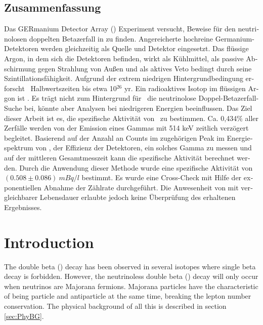 \documentclass[encoding=utf8,british]{tumphthesis}
\begin{document}
\begin{otherlanguage}{ngerman}
\chapter*{Zusammenfassung}
Das GERmanium Detector Array (\gerda) Experiment versucht, Beweise für den neutrinolosen doppelten Betazerfall in  zu finden.
Angereicherte hochreine Germanium-Detektoren werden gleichzeitig als Quelle und Detektor eingesetzt.
Das flüssige Argon, in dem sich die Detektoren befinden, wirkt als Kühlmittel, als passive Abschirmung gegen Strahlung von Außen und als aktives Veto bedingt durch seine Szintillationsfähigkeit.
Aufgrund der extrem niedrigen Hintergrundbedingung erforscht \gerda\ Halbwertszeiten bis etwa 10$^{26}$ yr.
Ein radioaktives Isotop im flüssigen Argon ist .
Es trägt nicht zum Hintergrund für \gerdas\ die neutrinolose Doppel-Betazerfall-Suche bei, könnte aber Analysen bei niedrigeren Energien beeinflussen.
Das Ziel dieser Arbeit ist es, die spezifische Aktivität von \Kr\ zu bestimmen.
Ca. 0,434$\%$ aller \Kr\-Zerfälle werden von der Emission eines Gammas mit 514 keV zeitlich verzögert begleitet.
Basierend auf der Anzahl an Counts im zugehörigen Peak im Energiespektrum von \gerda, der Effizienz der Detektoren, ein solches Gamma zu messen und auf der mittleren Gesamtmesszeit kann die spezifische \Kr\-Aktivität berechnet werden.
Durch die Anwendung dieser Methode wurde eine spezifische Aktivität von $(0.508\pm0.086) \   \unit{mBq}/ \unit{l}$ bestimmt.
Es wurde eine Cross-Check mit Hilfe der exponentiellen Abnahme der Zählrate durchgeführt.
Die Anwesenheit von  mit vergleichbarer Lebensdauer erlaubte jedoch keine Überprüfung des erhaltenen Ergebnisses.

\end{otherlanguage}

\tableofcontents

\mainmatter

\chapter{Introduction}
\label{sec:intro}

The double beta (\twonu) decay has been observed in several isotopes where single beta decay is forbidden.
However, the neutrinoless double beta (\onbb) decay will only occur when neutrinos are Majorana fermions.
Majorana particles have the characteristic of being particle and antiparticle at the same time, breaking the lepton number conservation.
The physical background of all this is described in section \ref{sec:PhyBG}.
\\
\end{document}

